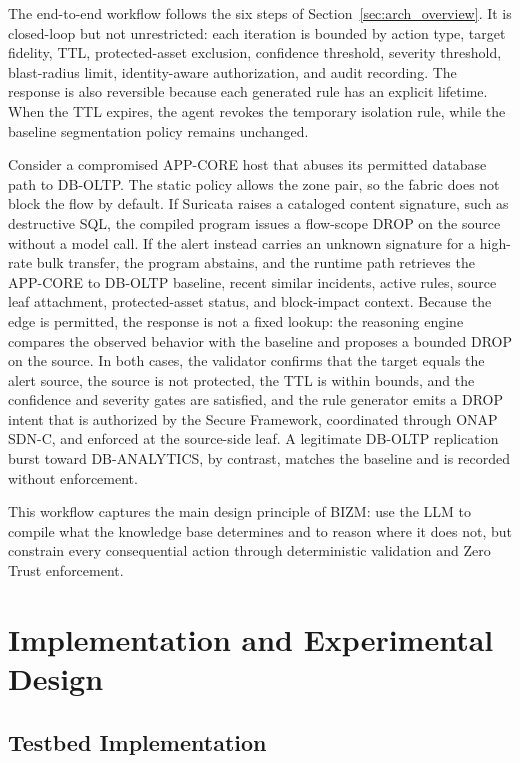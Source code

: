 \documentclass[final,5p]{elsarticle}
\begin{document}
The end-to-end workflow follows the six steps of Section~\ref{sec:arch_overview}. It is closed-loop but not unrestricted: each iteration is bounded by action type, target fidelity, TTL, protected-asset exclusion, confidence threshold, severity threshold, blast-radius limit, identity-aware authorization, and audit recording. The response is also reversible because each generated rule has an explicit lifetime. When the TTL expires, the agent revokes the temporary isolation rule, while the baseline segmentation policy remains unchanged.

Consider a compromised APP-CORE host that abuses its permitted database path to DB-OLTP. The static policy allows the zone pair, so the fabric does not block the flow by default. If Suricata raises a cataloged content signature, such as destructive SQL, the compiled program issues a flow-scope DROP on the source without a model call. If the alert instead carries an unknown signature for a high-rate bulk transfer, the program abstains, and the runtime path retrieves the APP-CORE to DB-OLTP baseline, recent similar incidents, active rules, source leaf attachment, protected-asset status, and block-impact context. Because the edge is permitted, the response is not a fixed lookup: the reasoning engine compares the observed behavior with the baseline and proposes a bounded DROP on the source. In both cases, the validator confirms that the target equals the alert source, the source is not protected, the TTL is within bounds, and the confidence and severity gates are satisfied, and the rule generator emits a DROP intent that is authorized by the Secure Framework, coordinated through ONAP SDN-C, and enforced at the source-side leaf. A legitimate DB-OLTP replication burst toward DB-ANALYTICS, by contrast, matches the baseline and is recorded without enforcement.

This workflow captures the main design principle of BIZM: use the LLM to compile what the knowledge base determines and to reason where it does not, but constrain every consequential action through deterministic validation and Zero Trust enforcement.

\section{Implementation and Experimental Design}
\label{sec:implementation_experiment}

\subsection{Testbed Implementation}
\label{sec:testbed_implementation}
\end{document}

